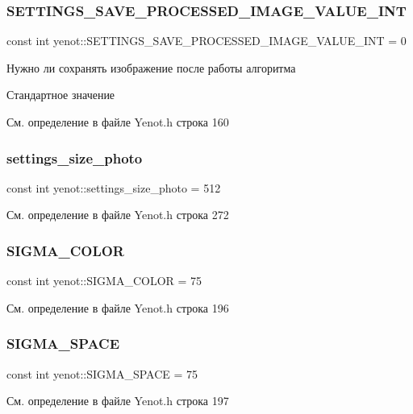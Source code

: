 \subsubsection{\texorpdfstring{S\+E\+T\+T\+I\+N\+G\+S\+\_\+\+S\+A\+V\+E\+\_\+\+P\+R\+O\+C\+E\+S\+S\+E\+D\+\_\+\+I\+M\+A\+G\+E\+\_\+\+V\+A\+L\+U\+E\+\_\+\+I\+NT}{SETTINGS\_SAVE\_PROCESSED\_IMAGE\_VALUE\_INT}}
{\footnotesize\ttfamily const int yenot\+::\+S\+E\+T\+T\+I\+N\+G\+S\+\_\+\+S\+A\+V\+E\+\_\+\+P\+R\+O\+C\+E\+S\+S\+E\+D\+\_\+\+I\+M\+A\+G\+E\+\_\+\+V\+A\+L\+U\+E\+\_\+\+I\+NT = 0}

Нужно ли сохранять изображение после работы алгоритма

Стандартное значение 

См. определение в файле Yenot.\+h строка 160

\mbox{\label{namespaceyenot_a4e9a58fa114bcb3d3ae09fb62129f2c9}} 
\subsubsection{\texorpdfstring{settings\+\_\+size\+\_\+photo}{settings\_size\_photo}}
{\footnotesize\ttfamily const int yenot\+::settings\+\_\+size\+\_\+photo = 512}



См. определение в файле Yenot.\+h строка 272

\mbox{\label{namespaceyenot_affd7404833d15c98fbd85249f43f98da}} 
\subsubsection{\texorpdfstring{S\+I\+G\+M\+A\+\_\+\+C\+O\+L\+OR}{SIGMA\_COLOR}}
{\footnotesize\ttfamily const int yenot\+::\+S\+I\+G\+M\+A\+\_\+\+C\+O\+L\+OR = 75}



См. определение в файле Yenot.\+h строка 196

\mbox{\label{namespaceyenot_ad45191f613b95ca3398e6eab5e202406}} 
\subsubsection{\texorpdfstring{S\+I\+G\+M\+A\+\_\+\+S\+P\+A\+CE}{SIGMA\_SPACE}}
{\footnotesize\ttfamily const int yenot\+::\+S\+I\+G\+M\+A\+\_\+\+S\+P\+A\+CE = 75}



См. определение в файле Yenot.\+h строка 197

